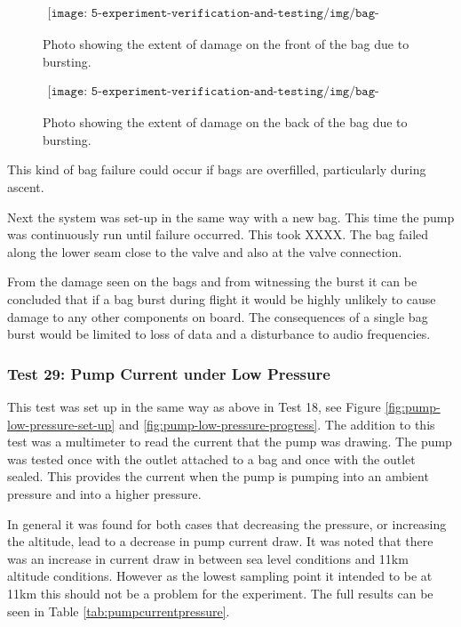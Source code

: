 \begin{figure}[H]
    \begin{align*}
        \texttt{[image: 5-experiment-verification-and-testing/img/bag-burst-front.png]}
    \end{align*}
    \caption {Photo showing the extent of damage on the front of the bag due to bursting.} \label{fig:bag-burst-front}
\end{figure}

\begin{figure}[H]
    \begin{align*}
        \texttt{[image: 5-experiment-verification-and-testing/img/bag-burst-back.png]}
    \end{align*}
    \caption {Photo showing the extent of damage on the back of the bag due to bursting.} \label{fig:bag-burst-back}
\end{figure}

This kind of bag failure could occur if bags are overfilled, particularly during ascent.

Next the system was set-up in the same way with a new bag. This time the pump was continuously run until failure occurred. This took XXXX. The bag failed along the lower seam close to the valve and also at the valve connection. 

From the damage seen on the bags and from witnessing the burst it can be concluded that if a bag burst during flight it would be highly unlikely to cause damage to any other components on board. The consequences of a single bag burst would be limited to loss of data and a disturbance to audio frequencies. 

\subsubsection{Test 29: Pump Current under Low Pressure}

This test was set up in the same way as above in Test 18, see Figure \ref{fig:pump-low-pressure-set-up} and \ref{fig:pump-low-pressure-progress}. The addition to this test was a multimeter to read the current that the pump was drawing. The pump was tested once with the outlet attached to a bag and once with the outlet sealed. This provides the current when the pump is pumping into an ambient pressure and into a higher pressure.

In general it was found for both cases that decreasing the pressure, or increasing the altitude, lead to a decrease in pump current draw. It was noted that there was an increase in current draw in between sea level conditions and 11km altitude conditions. However as the lowest sampling point it intended to be at 11km this should not be a problem for the experiment. The full results can be seen in Table \ref{tab:pumpcurrentpressure}. 

